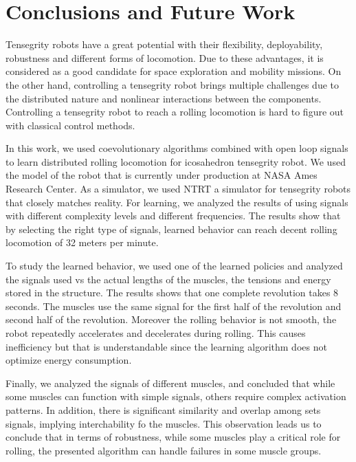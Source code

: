 \documentclass[twocolumn,10pt]{asme2ej}
\begin{document}
\section{Conclusions and Future Work}
\label{sec:conclusion}

Tensegrity robots have a great potential with their flexibility, deployability, robustness and  different forms of locomotion. Due to these advantages, it is considered as a good candidate for space exploration and mobility missions. On the other hand, controlling a tensegrity robot brings multiple challenges due to the distributed nature and nonlinear interactions between the components. Controlling a tensegrity robot to reach a rolling locomotion is hard to figure out with classical control methods.

In this work, we used coevolutionary algorithms combined with open loop signals to learn distributed rolling locomotion for icosahedron tensegrity robot. We used the model of the robot that is currently under production at NASA Ames Research Center. As a simulator, we used NTRT a simulator for tensegrity robots that closely matches reality. For learning, we analyzed the results of using signals with different complexity levels and different frequencies. The results show that by selecting the right type of signals, learned behavior can reach decent rolling locomotion of 32 meters per minute. 

To study the learned behavior, we used one of the learned policies and analyzed the signals used vs the actual lengths of the muscles, the tensions and energy stored in the structure. The results shows that one complete revolution takes 8 seconds. The muscles use the same signal for the first half of the revolution and second half of the revolution. Moreover the rolling behavior is not smooth, the robot repeatedly accelerates and decelerates during rolling. This causes inefficiency but that is understandable since the learning algorithm does not optimize energy consumption.

Finally, we analyzed the signals of different muscles, and concluded that while some muscles can function with simple signals, others require complex activation patterns. In addition, there is significant similarity and overlap among sets signals, implying interchability fo the muscles. This observation leads us to conclude that in terms of robustness, while some muscles play a critical role for rolling, the presented algorithm can handle failures in some muscle groups. 
\end{document}
